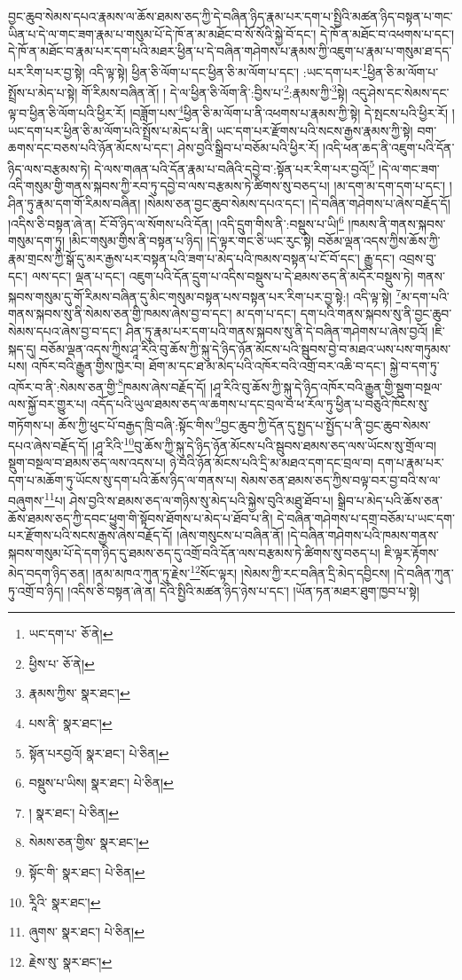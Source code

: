བྱང་ཆུབ་སེམས་དཔའ་རྣམས་ལ་ཆོས་ཐམས་ཅད་ཀྱི་དེ་བཞིན་ཉིད་རྣམ་པར་དག་པ་སྤྱིའི་མཚན་ཉིད་བསྟན་པ་གང་ཡིན་པ་དེ་ལ་གང་ཟག་རྣམ་པ་གསུམ་པོ་དེ་ཁོ་ན་མ་མཐོང་བ་སོ་སོའི་སྐྱེ་བོ་དང་། དེ་ཁོ་ན་མཐོང་བ་འཕགས་པ་དང་། དེ་ཁོ་ན་མཐོང་བ་རྣམ་པར་དག་པའི་མཐར་ཕྱིན་པ་དེ་བཞིན་གཤེགས་པ་རྣམས་ཀྱི་འཇུག་པ་རྣམ་པ་གསུམ་ཐ་དད་པར་རིག་པར་བྱ་སྟེ། འདི་ལྟ་སྟེ། ཕྱིན་ཅི་ལོག་པ་དང་ཕྱིན་ཅི་མ་ལོག་པ་དང་། :ཡང་དག་པར་\footnote{ཡང་དག་པ་  ཅོ་ནེ། }ཕྱིན་ཅི་མ་ལོག་པ་སྤྲོས་པ་མེད་པ་སྟེ། གོ་རིམས་བཞིན་ནོ། །
དེ་ལ་ཕྱིན་ཅི་ལོག་ནི་:བྱིས་པ་\footnote{ཕྱིས་པ་  ཅོ་ནེ། }:རྣམས་ཀྱི་\footnote{རྣམས་ཀྱིས་  སྣར་ཐང་། }སྟེ། འདུ་ཤེས་དང་སེམས་དང་ལྟ་བ་ཕྱིན་ཅི་ལོག་པའི་ཕྱིར་རོ། །བཟློག་པས་\footnote{པས་ནི་  སྣར་ཐང་། }ཕྱིན་ཅི་མ་ལོག་པ་ནི་འཕགས་པ་རྣམས་ཀྱི་སྟེ། དེ་སྤངས་པའི་ཕྱིར་རོ། །ཡང་དག་པར་ཕྱིན་ཅི་མ་ལོག་པའི་སྤྲོས་པ་མེད་པ་ནི། ཡང་དག་པར་རྫོགས་པའི་སངས་རྒྱས་རྣམས་ཀྱི་སྟེ། བག་ཆགས་དང་བཅས་པའི་ཉོན་མོངས་པ་དང་། ཤེས་བྱའི་སྒྲིབ་པ་བཅོམ་པའི་ཕྱིར་རོ། །འདི་ཕན་ཆད་ནི་འཇུག་པའི་དོན་ཉིད་ལས་བརྩམས་ཏེ། དེ་ལས་གཞན་པའི་དོན་རྣམ་པ་བཞིའི་དབྱེ་བ་:སྟོན་པར་རིག་པར་བྱའོ།\footnote{སྟོན་པརབྱའོ།  སྣར་ཐང་།  པེ་ཅིན། } །དེ་ལ་གང་ཟག་འདི་གསུམ་གྱི་གནས་སྐབས་ཀྱི་རབ་ཏུ་དབྱེ་བ་ལས་བརྩམས་ཏེ་ཚིགས་སུ་བཅད་པ། །མ་དག་མ་དག་དག་པ་དང་། །ཤིན་ཏུ་རྣམ་དག་གོ་རིམས་བཞིན། །སེམས་ཅན་བྱང་ཆུབ་སེམས་དཔའ་དང་། །དེ་བཞིན་གཤེགས་པ་ཞེས་བརྗོད་དོ། །འདིས་ཅི་བསྟན་ཞེ་ན། ངོ་བོ་ཉིད་ལ་སོགས་པའི་དོན། །འདི་དྲུག་གིས་ནི་:བསྡུས་པ་ཡི།\footnote{བསྡུས་པ་ཡིས།  སྣར་ཐང་།  པེ་ཅིན། } །ཁམས་ནི་གནས་སྐབས་གསུམ་དག་ཏུ། །མིང་གསུམ་གྱིས་ནི་བསྟན་པ་ཉིད། །དེ་ལྟར་གང་ཅི་ཡང་རུང་སྟེ། བཅོམ་ལྡན་འདས་ཀྱིས་ཆོས་ཀྱི་རྣམ་གྲངས་ཀྱི་སྒོ་དུ་མར་རྒྱས་པར་བསྟན་པའི་ཟག་པ་མེད་པའི་ཁམས་བསྟན་པ་ངོ་བོ་དང་། རྒྱུ་དང་། འབྲས་བུ་དང་། ལས་དང་། ལྡན་པ་དང་། འཇུག་པའི་དོན་དྲུག་པ་འདིས་བསྡུས་པ་དེ་ཐམས་ཅད་ནི་མདོར་བསྡུས་ཏེ། གནས་སྐབས་གསུམ་དུ་གོ་རིམས་བཞིན་དུ་མིང་གསུམ་བསྟན་པས་བསྟན་པར་རིག་པར་བྱ་སྟེ:། འདི་ལྟ་སྟེ། \footnote{།    སྣར་ཐང་།  པེ་ཅིན། }མ་དག་པའི་གནས་སྐབས་སུ་ནི་སེམས་ཅན་གྱི་ཁམས་ཞེས་བྱ་བ་དང་། མ་དག་པ་དང་། དག་པའི་གནས་སྐབས་སུ་ནི་བྱང་ཆུབ་སེམས་དཔའ་ཞེས་བྱ་བ་དང་། ཤིན་ཏུ་རྣམ་པར་དག་པའི་གནས་སྐབས་སུ་ནི་དེ་བཞིན་གཤེགས་པ་ཞེས་བྱའོ། །ཇི་སྐད་དུ། བཅོམ་ལྡན་འདས་ཀྱིས་ཤཱ་རིའི་བུ་ཆོས་ཀྱི་སྐུ་དེ་ཉིད་ཉོན་མོངས་པའི་སྦུབས་བྱེ་བ་མཐའ་ཡས་པས་གཏུམས་པས། འཁོར་བའི་རྒྱུན་གྱིས་ཁྱེར་བ། ཐོག་མ་དང་ཐ་མ་མེད་པའི་འཁོར་བའི་འགྲོ་བར་འཆི་བ་དང་། སྐྱེ་བ་དག་ཏུ་འཁོར་བ་ནི་:སེམས་ཅན་གྱི་\footnote{སེམས་ཅན་གྱིས་  སྣར་ཐང་། }ཁམས་ཞེས་བརྗོད་དོ། །ཤཱ་རིའི་བུ་ཆོས་ཀྱི་སྐུ་དེ་ཉིད་འཁོར་བའི་རྒྱུན་གྱི་སྡུག་བསྔལ་ལས་སྐྱོ་བར་གྱུར་པ། འདོད་པའི་ཡུལ་ཐམས་ཅད་ལ་ཆགས་པ་དང་བྲལ་བ་ཕ་རོལ་ཏུ་ཕྱིན་པ་བཅུའི་ཁོངས་སུ་གཏོགས་པ། ཆོས་ཀྱི་ཕུང་པོ་བརྒྱད་ཁྲི་བཞི་:སྟོང་གིས་\footnote{སྟོང་གི་  སྣར་ཐང་།  པེ་ཅིན། }བྱང་ཆུབ་ཀྱི་དོན་དུ་སྤྱད་པ་སྤྱོད་པ་ནི་བྱང་ཆུབ་སེམས་དཔའ་ཞེས་བརྗོད་དོ། །ཤཱ་རིའི་\footnote{རཱིའི་  སྣར་ཐང་། }བུ་ཆོས་ཀྱི་སྐུ་དེ་ཉིད་ཉོན་མོངས་པའི་སྦུབས་ཐམས་ཅད་ལས་ཡོངས་སུ་གྲོལ་བ། སྡུག་བསྔལ་བ་ཐམས་ཅད་ལས་འདས་པ། ཉེ་བའི་ཉོན་མོངས་པའི་དྲི་མ་མཐའ་དག་དང་བྲལ་བ། དག་པ་རྣམ་པར་དག་པ་མཆོག་ཏུ་ཡོངས་སུ་དག་པའི་ཆོས་ཉིད་ལ་གནས་པ། སེམས་ཅན་ཐམས་ཅད་ཀྱིས་བལྟ་བར་བྱ་བའི་ས་ལ་བཞུགས་\footnote{ཞུགས་  སྣར་ཐང་།  པེ་ཅིན། }པ། ཤེས་བྱའི་ས་ཐམས་ཅད་ལ་གཉིས་སུ་མེད་པའི་སྐྱེས་བུའི་མཐུ་ཐོབ་པ། སྒྲིབ་པ་མེད་པའི་ཆོས་ཅན་ཆོས་ཐམས་ཅད་ཀྱི་དབང་ཕྱུག་གི་སྟོབས་ཐོགས་པ་མེད་པ་ཐོབ་པ་ནི། དེ་བཞིན་གཤེགས་པ་དགྲ་བཅོམ་པ་ཡང་དག་པར་རྫོགས་པའི་སངས་རྒྱས་ཞེས་བརྗོད་དོ། །ཞེས་གསུངས་པ་བཞིན་ནོ། །དེ་བཞིན་གཤེགས་པའི་ཁམས་གནས་སྐབས་གསུམ་པོ་དེ་དག་ཉིད་དུ་ཐམས་ཅད་དུ་འགྲོ་བའི་དོན་ལས་བརྩམས་ཏེ་ཚིགས་སུ་བཅད་པ། ཇི་ལྟར་རྟོགས་མེད་བདག་ཉིད་ཅན། །ནམ་མཁའ་ཀུན་ཏུ་རྗེས་\footnote{རྗེས་སུ་  སྣར་ཐང་། }སོང་ལྟར། །སེམས་ཀྱི་རང་བཞིན་དྲི་མེད་དབྱིངས། །དེ་བཞིན་ཀུན་ཏུ་འགྲོ་བ་ཉིད། །འདིས་ཅི་བསྟན་ཞེ་ན། དེའི་སྤྱིའི་མཚན་ཉིད་ཉེས་པ་དང་། །ཡོན་ཏན་མཐར་ཐུག་ཁྱབ་པ་སྟེ། 